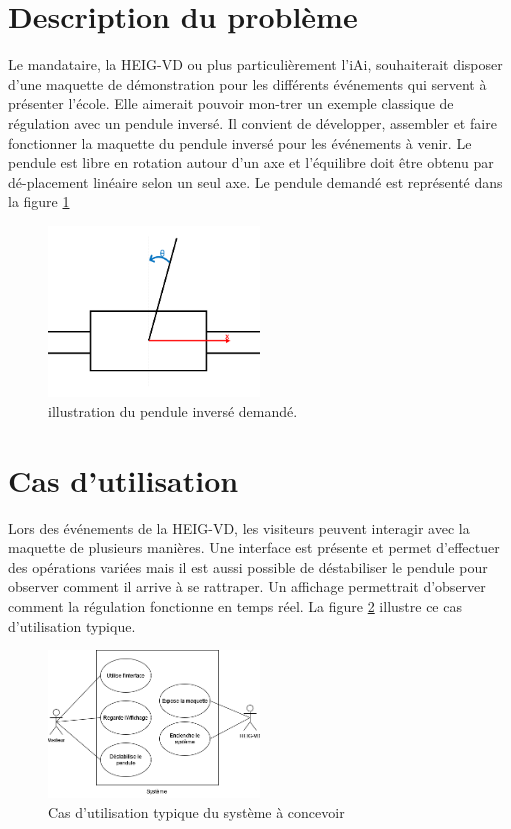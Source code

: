 \section{Description du problème}\label{sec:DescProb}
Le mandataire, la HEIG-VD ou plus particulièrement l'iAi, souhaiterait disposer d'une maquette de démonstration pour les différents événements qui servent à présenter l'école. Elle aimerait pouvoir mon-trer un exemple classique de régulation avec un pendule inversé.
Il convient de développer, assembler et faire fonctionner la maquette du pendule inversé pour les événements à venir. Le pendule est libre en rotation autour d'un axe et l'équilibre doit être obtenu par dé-placement linéaire selon un seul axe. Le pendule demandé est représenté dans la figure \ref{fig:Illustration}

\begin{figure}[H]
    \centering
    \includegraphics*[width = 0.5\textwidth]{assets/figures/IllustrationPendule.png}
    \caption{illustration du pendule inversé demandé.}
    \label{fig:Illustration}
\end{figure}

\section{Cas d'utilisation}\label{sec:CasUtil}
Lors des événements de la HEIG-VD, les visiteurs peuvent interagir avec la maquette de plusieurs manières. Une interface est présente et permet d'effectuer des opérations variées mais il est aussi possible de déstabiliser le pendule pour observer comment il arrive à se rattraper. Un affichage permettrait d'observer comment la régulation fonctionne en temps réel.
La figure \ref{fig:CasUtil} illustre ce cas d'utilisation typique.

\begin{figure}[H]
    \centering
    \includegraphics[width = 0.5\textwidth]{assets/figures/CasUtil.png}
    \caption{Cas d'utilisation typique  du système à concevoir}
    \label{fig:CasUtil}
\end{figure}

